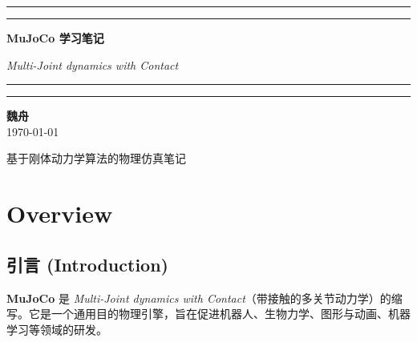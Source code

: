 \documentclass[11pt,a4paper]{book}
\begin{document}
\begin{titlepage}
    \centering
    
    \vspace*{3cm}
    
    \rule{\textwidth}{1pt}\par
    \vspace{0.2cm}
    \rule{\textwidth}{3pt}\par
    
    \vspace{1.5cm}
    
    {\Huge \bfseries MuJoCo 学习笔记 \par}
    \vspace{0.5cm}
    {\Large \itshape Multi-Joint dynamics with Contact \par}
    
    \vspace{1.5cm}
    
    \rule{\textwidth}{3pt}\par
    \vspace{0.2cm}
    \rule{\textwidth}{1pt}\par
    
    \vspace{2.5cm}
    
    \begin{flushright}
        {\Large \textbf{魏舟} } \\
        \vspace{0.5cm}
        {\large \today}
    \end{flushright}
    
    \vfill
    
    {\color{gray} \footnotesize 基于刚体动力学算法的物理仿真笔记}

\end{titlepage}

\frontmatter
\tableofcontents

\mainmatter
\chapter{Overview}
\section{引言 (Introduction)}
\textbf{MuJoCo} 是 \textit{Multi-Joint dynamics with Contact}（带接触的多关节动力学）的缩写。它是一个通用目的物理引擎，旨在促进机器人、生物力学、图形与动画、机器学习等领域的研发。
\end{document}
